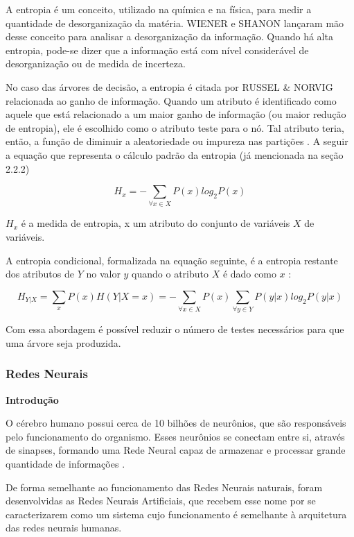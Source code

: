 A entropia é um conceito, utilizado na química e na física, para medir a quantidade de desorganização da matéria. WIENER e SHANON \cite{Pineda2006} lançaram mão desse conceito para analisar a desorganização da informação. Quando há alta entropia, pode-se dizer que a informação está com nível considerável de desorganização ou de medida de incerteza.

No caso das árvores de decisão, a entropia é citada por RUSSEL \& NORVIG \cite{NorvigRussel2004} relacionada ao ganho de informação. Quando um atributo é identificado como aquele que está relacionado a um maior ganho de informação (ou maior redução de entropia), ele é escolhido como o atributo teste para o nó. Tal atributo teria, então, a função de diminuir a aleatoriedade ou impureza nas partições \cite{Simoes2008}. A seguir a equação que representa o cálculo padrão da entropia (já mencionada na seção 2.2.2)
 
\begin{equation}
H_{x}=-\sum_{\forall x \in X}P(x)log_{2}P(x)
\end{equation}

$ H_{x} $ é a medida de entropia, x um atributo do conjunto de variáveis $X$ de variáveis. 

A entropia condicional, formalizada na equação seguinte, é a entropia restante dos atributos de $Y$ no valor $y$ quando o atributo $X$ é dado como $x$ \cite{DecisionTree}:

\begin{equation}
H_{Y|X}= \sum_{x}P(x)H(Y|X=x) =-\sum_{\forall x \in X}P(x) \sum_{\forall y \in Y}P(y|x)log_{2}P(y|x)
\end{equation}

Com essa abordagem é possível reduzir o número de testes necessários para que uma árvore seja produzida.


\subsubsection{Redes Neurais}

\textbf{Introdução}
\vspace{5mm}

O cérebro humano possui cerca de 10 bilhões de neurônios, que são responsáveis pelo funcionamento do organismo. 
Esses neurônios se conectam entre si, através de sinapses, formando uma Rede Neural capaz de armazenar e processar grande quantidade de informações \cite{NorvigRussel2004}.

De forma semelhante ao funcionamento das Redes Neurais naturais, foram desenvolvidas as Redes Neurais Artificiais, que recebem esse nome por se caracterizarem como um 
sistema cujo funcionamento é semelhante à arquitetura das redes neurais humanas.

